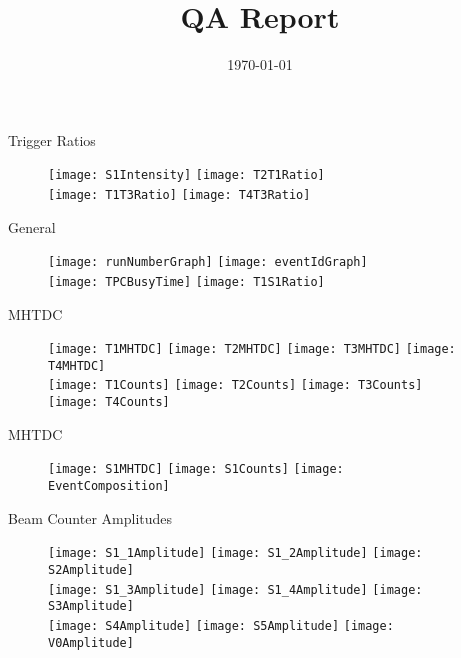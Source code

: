 \documentclass[11pt]{beamer}
\title[QA]{QA Report}
\date{\today}
\begin{document}
\begin{frame}
  \titlepage
\end{frame}

\begin{frame}{Trigger Ratios}
\begin{figure}
\centering
\texttt{[image: S1Intensity]}
\texttt{[image: T2T1Ratio]} \\
\texttt{[image: T1T3Ratio]}
\texttt{[image: T4T3Ratio]} \\
\end{figure}
\end{frame}

\begin{frame}{General}
\begin{figure}
\centering
\texttt{[image: runNumberGraph]}
\texttt{[image: eventIdGraph]} \\
\texttt{[image: TPCBusyTime]}
\texttt{[image: T1S1Ratio]} \\
\end{figure}
\end{frame}

\begin{frame}{MHTDC}
\begin{figure}
\centering
\texttt{[image: T1MHTDC]} 
\texttt{[image: T2MHTDC]} 
\texttt{[image: T3MHTDC]} 
\texttt{[image: T4MHTDC]} \\
\texttt{[image: T1Counts]} 
\texttt{[image: T2Counts]} 
\texttt{[image: T3Counts]} 
\texttt{[image: T4Counts]} 
\end{figure}
\end{frame}

\begin{frame}{MHTDC}
\begin{figure}
\centering
\texttt{[image: S1MHTDC]} 
\texttt{[image: S1Counts]} 
\texttt{[image: EventComposition]} 
\end{figure}
\end{frame}

\begin{frame}{Beam Counter Amplitudes}
\begin{figure}
\centering
\texttt{[image: S1\_1Amplitude]} 
\texttt{[image: S1\_2Amplitude]}
\texttt{[image: S2Amplitude]} \\
\texttt{[image: S1\_3Amplitude]}
\texttt{[image: S1\_4Amplitude]}
\texttt{[image: S3Amplitude]} \\
\texttt{[image: S4Amplitude]}
\texttt{[image: S5Amplitude]} 
\texttt{[image: V0Amplitude]} \\
\end{figure}
\end{frame}
\end{document}
